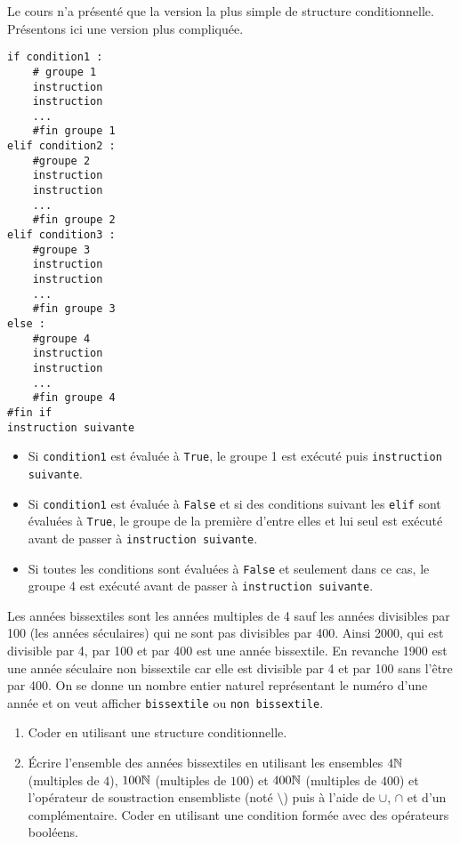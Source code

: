 Le cours n'a présenté que la version la plus simple de structure conditionnelle. Présentons ici une version plus compliquée.
\begin{verbatim}
if condition1 :
    # groupe 1
    instruction
    instruction
    ...
    #fin groupe 1
elif condition2 :
    #groupe 2
    instruction
    instruction
    ...
    #fin groupe 2
elif condition3 :
    #groupe 3
    instruction
    instruction
    ...
    #fin groupe 3
else :
    #groupe 4
    instruction
    instruction
    ...
    #fin groupe 4
#fin if
instruction suivante
\end{verbatim}
\begin{itemize}
 \item Si \texttt{condition1} est évaluée à \texttt{True}, le groupe 1 est exécuté puis \texttt{instruction suivante}.
 \item Si \texttt{condition1} est évaluée à \texttt{False} et si des conditions suivant les \texttt{elif} sont évaluées à \texttt{True}, le groupe de la première d'entre elles et lui seul est exécuté avant de passer à \texttt{instruction suivante}.
 \item Si toutes les conditions sont évaluées à \texttt{False} et seulement dans ce cas, le groupe 4 est exécuté avant de passer à \texttt{instruction suivante}.
\end{itemize}
Les années bissextiles sont les années multiples de 4 sauf les années divisibles par 100 (les années séculaires) qui ne sont pas divisibles par 400. Ainsi 2000, qui est divisible par 4, par 100 et par 400 est une année bissextile. En revanche 1900 est une année séculaire non bissextile car elle est divisible par 4 et par 100 sans l'être par 400.\newline
On se donne un nombre entier naturel représentant le numéro d'une année et on veut afficher \texttt{bissextile} ou \texttt{non bissextile}.
\begin{enumerate}
 \item Coder en utilisant une structure conditionnelle.
 \item \'Ecrire l'ensemble des années bissextiles en utilisant les ensembles $4\mathbb{N}$ (multiples de $4$), $100\mathbb{N}$ (multiples de $100$) et $400\mathbb{N}$ (multiples de $400$) et l'opérateur de soustraction ensembliste (noté $\setminus$) puis à l'aide de $\cup$, $\cap$ et d'un complémentaire. Coder en utilisant une condition formée avec des opérateurs booléens.
\end{enumerate}

